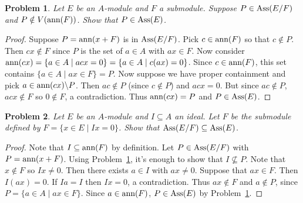 \documentclass{article}
\newcommand{\ass}{\textup{Ass}}
\newcommand{\ann}{\textup{ann}}
\newtheorem{problem}{Problem}
\begin{document}
\begin{problem}
\label{notinann}
Let $E$ be an $A$-module and $F$ a submodule. Suppose $P \in \ass(E/F)$ and $P \notin V(\ann(F))$. Show that $P \in \ass(E)$.
\end{problem}
\begin{proof}
Suppose $P = \ann(x + F)$ is in $\ass(E/F)$. Pick $c \in \ann(F)$ so that $c \notin P$. Then $cx \notin F$ since $P$ is the set of $a \in A$ with $ax \in F$. Now consider $\ann(cx) = \{a \in A \mid acx = 0\} = \{a \in A \mid c(ax) = 0\}$. Since $c \in \ann(F)$, this set contains $\{a \in A \mid ax \in F\} = P$. Now suppose we have proper containment and pick $a \in \ann(cx) \backslash P$. Then $ac \notin P$ (since $c \notin P$) and $acx = 0$. But since $ac \notin P$, $acx \notin F$ so $0 \notin F$, a contradiction. Thus $\ann(cx) = P$ and $P \in \ass(E)$.
\end{proof}

\begin{problem}
Let $E$ be an $A$-module and $I \subseteq A$ an ideal. Let $F$ be the submodule defined by $F = \{x \in E \mid Ix = 0\}$. Show that $\ass(E/F) \subseteq \ass(E)$.
\end{problem}
\begin{proof}
Note that $I \subseteq \ann(F)$ by definition. Let $P \in \ass(E/F)$ with $P = \ann(x + F)$. Using Problem~\ref{notinann}, it's enough to show that $I \nsubseteq P$. Note that $x \notin F$ so $Ix \neq 0$. Then there exists $a \in I$ with $ax \neq 0$. Suppose that $ax \in F$. Then $I(ax) = 0$. If $Ia = I$ then $Ix = 0$, a contradiction. Thus $ax \notin F$ and $a \notin P$, since $P = \{a \in A \mid ax \in F\}$. Since $a \in \ann(F)$, $P \in \ass(E)$ by Problem~\ref{notinann}.
\end{proof}
\end{document}
